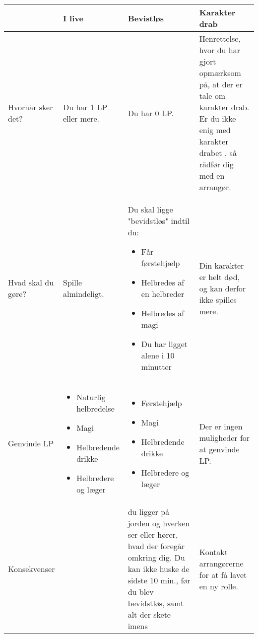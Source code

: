 \begin{longtable}{|p{}|p{}|p{}|p{}|}
    \hline\rowcolor{cerulean!80}
         & I live & Bevistløs &Karakter drab \\\hline
        \endhead
        Hvornår sker det? & Du har 1 LP eller mere. & Du har 0 LP.  & Henrettelse, hvor du har gjort opmærksom på, at der er tale om karakter drab. Er du ikke enig med karakter drabet , så rådfør dig med en arrangør.\\\hline

        Hvad skal du gøre? & Spille almindeligt. & Du skal ligge "bevidstløs" indtil du: \begin{itemize} 
            \item Får førstehjælp
            \item Helbredes af en helbreder
            \item Helbredes af magi
            \item Du har ligget alene i 10 minutter
        \end{itemize}& Din karakter er helt død, og kan derfor ikke spilles mere.\\\hline
        
        Genvinde LP & \begin{itemize}
            \item Naturlig helbredelse
            \item Magi
            \item Helbredende drikke
            \item Helbredere og læger
         \end{itemize}& \begin{itemize}
             \item Førstehjælp
             \item Magi
             \item Helbredende drikke
             \item Helbredere og læger
         \end{itemize}&
         Der er ingen muligheder for at genvinde LP.\\\hline
    
        Konsekvenser & & du ligger på jorden og hverken ser eller hører, hvad der foregår omkring dig. Du kan ikke huske de sidste 10 min., før du blev bevidstløs, samt alt der skete imens& Kontakt arrangørerne for at få lavet en ny rolle. \\\hline
\end{longtable}

